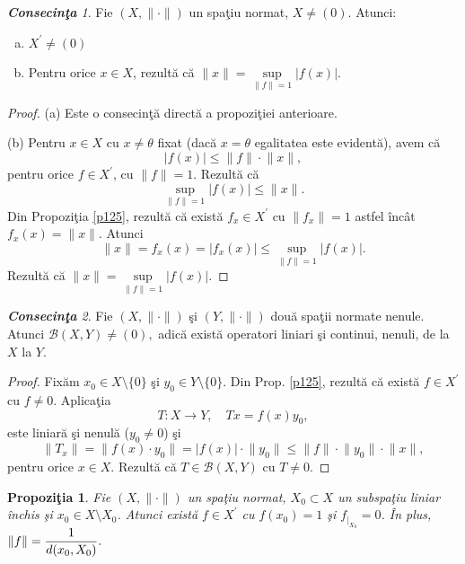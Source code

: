 \documentclass[ a4paper, 12pt]{report}
\newtheorem{prop}[theorem]{\bf Propozi\c tia }
\theoremstyle{definition}
\theoremstyle{remark}
\newtheorem{cons}{\bf Consecin\c ta }[section]
\numberwithin{equation}{section}
\begin{document}
\begin{cons}\label{c121}
Fie $(X,\lVert \cdot \rVert)$ un spa\c tiu normat, $X \neq (0)$. Atunci:
\begin{enumerate}[(a)]
\item $X^{'} \neq (0)$
\item Pentru orice $x \in X$, rezult\u a c\u a $\lVert x \rVert = \sup\limits_{\lVert f \rVert = 1}\lvert f(x) \rvert$.
\end{enumerate}
\end{cons}

\begin{proof}
(a) Este o consecin\c t\u a  direct\u a a propozi\c tiei anterioare.

(b) Pentru $x \in X$ cu $x \neq \theta$ fixat (dac\u a $x = \theta$ egalitatea este evident\u a), avem c\u a
$$\lvert f(x) \rvert \leq \lVert f \rVert \cdot \lVert x \rVert,$$ pentru orice $f \in X^{'}$, cu $\lVert f \rVert = 1$. Rezult\u a c\u a
$$\sup\limits_{\lVert f \rVert = 1} \lvert f(x) \rvert \leq \lVert x \rVert.$$
Din Propozi\c tia \ref{p125}, rezult\u a c\u a exist\u a $f_x \in X^{'}$ cu $\lVert f_x \rVert = 1$ astfel \^inc\^at $f_x(x) = \lVert  x \rVert$. Atunci
$$\lVert x \rVert = f_x(x) = \lvert f_x(x) \rvert \leq \sup\limits_{\lVert f \rVert = 1}\lvert f(x) \rvert.$$
Rezult\u a c\u a $\lVert x \rVert = \sup\limits_{\lVert f \rVert = 1}\lvert f(x) \rvert.$
\end{proof}

\begin{cons}\label{c122}
Fie $(X, \lVert \cdot \rVert)$ \c si $(Y,\lVert \cdot  \rVert)$ dou\u a spa\c tii normate nenule. Atunci $\mathcal{B}(X,Y) \neq (0),$ adic\u a exist\u a operatori liniari \c si continui, nenuli, de la $X$ la $Y$.
\end{cons}

\begin{proof}
Fix\u am $x_0 \in X\setminus \{ 0 \}$ \c si $y_0 \in Y \setminus \{ 0 \}$. Din Prop. \ref{p125}, rezult\u a c\u a exist\u a $f \in X^{'}$ cu $f \neq 0.$
Aplica\c tia
$$T : X \rightarrow Y,\quad  Tx = f(x)  y_0,$$ este liniar\u a \c si nenul\u a ($y_0 \neq 0$) \c si
$$\lVert T_x \rVert = \lVert f(x) \cdot y_0 \rVert = \lvert f(x) \rvert \cdot \lVert y_0 \rVert \leq \lVert f  \rVert \cdot \lVert y_0 \rVert \cdot \lVert x \rVert,$$ pentru orice $x \in X$. Rezult\u a c\u a $T \in \mathcal{B}(X,Y) $ cu $T \neq 0.$
\end{proof}

\begin{prop}\label{p126}
Fie $(X,\lVert \cdot \rVert)$ un spa\c tiu normat, $X_0 \subset X$ un subspa\c tiu liniar \^inchis \c si $x_0 \in X \setminus X_0$.
Atunci exist\u a $f \in X^{'}$ cu $f(x_0) = 1$ \c si $f_{|_{X_0}} = 0$.
\^In plus, $\lVert f \rVert = \displaystyle\frac{1}{d(x_0,X_0)}.$
\end{prop}
\end{document}
